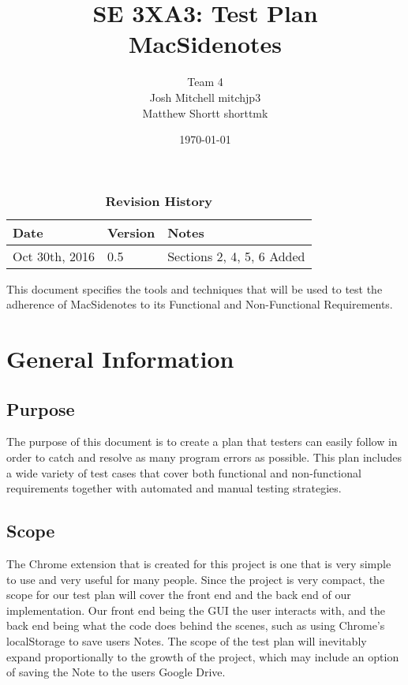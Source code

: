\documentclass[12pt, titlepage]{article}
\title{SE 3XA3: Test Plan\\MacSidenotes}
\author{Team 4
		\\ Josh Mitchell mitchjp3
		\\ Matthew Shortt shorttmk
}
\date{\today}
\begin{document}
\maketitle

\tableofcontents
\listoftables
\listoffigures

\begin{table}[bp]
\caption{\bf Revision History}
\begin{tabularx}{\textwidth}{p{3cm}p{2cm}X}
\toprule {\bf Date} & {\bf Version} & {\bf Notes}\\
\midrule
Oct 30th, 2016 & 0.5 & Sections 2, 4, 5, 6 Added\\
\bottomrule
\end{tabularx}
\end{table}

\newpage


This document specifies the tools and techniques that will be used to test the 
adherence of MacSidenotes to its Functional and Non-Functional Requirements. 

\section{General Information}

\subsection{Purpose}

The purpose of this document is to create a plan that testers can easily follow in 
order to catch and resolve as many program errors as possible. This plan includes a wide 
variety of test cases that cover both functional and non-functional requirements together 
with automated and manual testing strategies. 

\subsection{Scope}

The Chrome extension that is created for this project is one that is very simple to use and 
very useful for many people.  Since the project is very compact, the scope for our test 
plan will cover the front end and the back end of our implementation. Our front end being 
the GUI the user interacts with, and the back end being what the code does behind the 
scenes, such as using Chrome's localStorage to save users Notes. The scope of the test 
plan will inevitably expand proportionally to the growth of the project, which may include 
an option of saving the Note to the users Google Drive.
\end{document}
